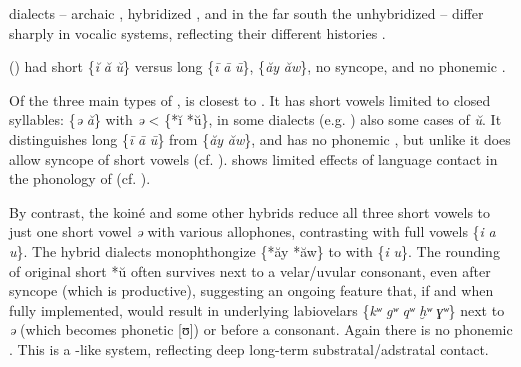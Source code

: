 \documentclass[output=paper]{langsci/langscibook}
\begin{document}
 dialects – archaic , hybridized , and in the far south the unhybridized  – differ sharply in vocalic systems, reflecting their different histories \citep{Heath2018}.

 () had short \{\textit{ĭ} \textit{ă} \textit{ŭ}\} versus long \{\textit{ī} \textit{ā} \textit{ū}\},  \{\textit{ăy} \textit{ăw}\}, no syncope, and no phonemic . 

Of the three main types of ,  is closest to . It has short vowels limited to closed syllables: \{\textit{ə} \textit{ă}\} with \textit{ə} < \{*ĭ *ŭ\}, in some dialects (e.g. ) also some cases of \textit{ŭ}. It distinguishes long \{\textit{ī} \textit{ā} \textit{ū}\} from  \{\textit{ăy} \textit{ăw}\}, and has no phonemic , but unlike  it does allow syncope of short vowels (cf. \citealt{Taine-Cheikh1988article}).  shows limited effects of language contact in the phonology of   (cf. \citealt{Taine-Cheikh1997Zenaga}).

By contrast, the koiné and some other hybrids reduce all three short vowels to just one short vowel \textit{ə} with various allophones, contrasting with full vowels \{\textit{i} \textit{a} \textit{u}\}. The hybrid dialects monophthongize \{*ăy *ăw\} to  with \{\textit{i} \textit{u}\}. The rounding of original short *ŭ often survives next to a velar/uvular consonant, even after syncope (which is productive), suggesting an ongoing feature  that, if and when fully implemented, would result in underlying labiovelars \{\textit{kʷ} \textit{gʷ} \textit{qʷ} \textit{ḫʷ} \textit{ɣʷ}\} next to \textit{ə} (which becomes phonetic [ʊ]) or before a consonant. Again there is no phonemic . This is a -like system, reflecting deep long-term substratal/adstratal contact.
\end{document}
